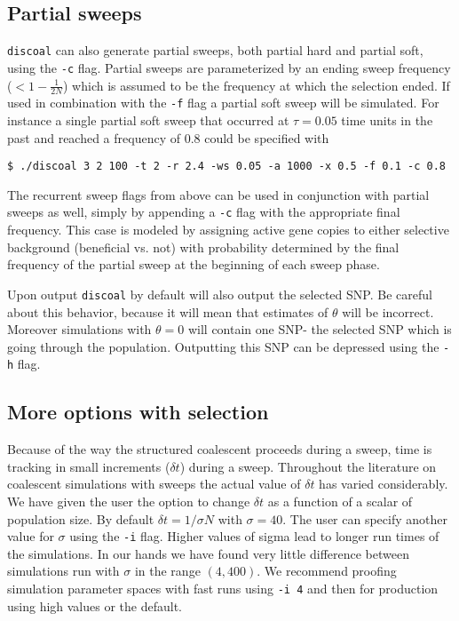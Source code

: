 \documentclass[12pt]{article}
\begin{document}
\subsection*{Partial sweeps}
\texttt{discoal} can also generate partial sweeps, both partial hard and partial soft, using the \texttt{-c} flag. Partial sweeps are parameterized by an ending sweep frequency ($< 1-\frac{1}{2N}$) which is assumed to be the frequency at which the selection ended. If used in combination with the \texttt{-f} flag a partial soft sweep will be simulated. For instance a single partial soft sweep that occurred at $\tau=0.05$ time units in the past and reached a frequency of $0.8$ could be specified with
\begin{verbatim}
$ ./discoal 3 2 100 -t 2 -r 2.4 -ws 0.05 -a 1000 -x 0.5 -f 0.1 -c 0.8
\end{verbatim}

The recurrent sweep flags from above can be used in conjunction with partial sweeps as well, simply by appending a \texttt{-c} flag with the appropriate final frequency. This case is modeled by assigning active gene copies to either selective background (beneficial vs. not) with probability determined by the final frequency of the partial sweep at the beginning of each sweep phase. 

Upon output \texttt{discoal} by default will also output the selected SNP. Be careful about this behavior, because it will mean that estimates of $\theta$ will be incorrect. Moreover simulations with $\theta=0$ will contain one SNP- the selected SNP which is going through the population. Outputting this SNP can be depressed using the \texttt{-h} flag.


\subsection*{More options with selection}
Because of the way the structured coalescent proceeds during a sweep, time is tracking in small increments ($\delta t$) during a sweep. Throughout the literature on coalescent simulations with sweeps the actual value of $\delta t$ has varied considerably. We have given the user the option to change $\delta t$ as a function of a scalar of population size. By default $\delta t = 1/\sigma N$ with $\sigma=40$. The user can specify another value for $\sigma$ using the \texttt{-i} flag. Higher values of sigma lead to longer run times of the simulations. In our hands we have found very little difference between simulations run with $\sigma$ in the range $(4,400)$. We recommend proofing simulation parameter spaces with fast runs using \texttt{-i 4} and then for production using high values or the default.  
\end{document}
